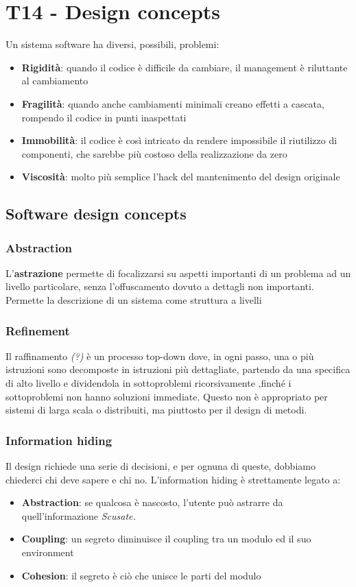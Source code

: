 \documentclass[11pt]{article}
\begin{document}
\section{T14 - Design concepts}
Un sistema software ha diversi, possibili, problemi: 
\begin{itemize}
    \item \textbf{Rigidità}: quando il codice è difficile da cambiare, il management è riluttante al cambiamento 
    \item \textbf{Fragilità}: quando anche cambiamenti minimali creano effetti a cascata, rompendo il codice in punti inaspettati 
    \item \textbf{Immobilità}: il codice è così intricato da rendere impossibile il riutilizzo di componenti, che sarebbe più costoso della realizzazione da zero
    \item \textbf{Viscosità}: molto più semplice l'hack del mantenimento del design originale
\end{itemize}
\subsection{Software design concepts}
\subsubsection{Abstraction}
L'\textbf{astrazione} permette di focalizzarsi su aspetti importanti di un problema ad un livello particolare, senza l'offuscamento dovuto a dettagli non importanti. Permette la descrizione di un sistema come struttura a livelli 
\subsubsection{Refinement} 
Il raffinamento \textit{(?)} è un processo top-down dove, in ogni passo, una o più istruzioni sono decomposte in istruzioni più dettagliate, partendo da una specifica di alto livello e dividendola in sottoproblemi ricorsivamente ,finché i sottoproblemi non hanno soluzioni immediate. Questo non è appropriato per sistemi di larga scala o distribuiti, ma piuttosto per il design di metodi. 
\subsubsection{Information hiding}
Il design richiede una serie di decisioni, e per ognuna di queste, dobbiamo chiederci chi deve sapere e chi no. L'information hiding è strettamente legato a:
\begin{itemize}
    \item \textbf{Abstraction}: se qualcosa è nascosto, l'utente può astrarre da quell'informazione \textit{Scusate.}
    \item \textbf{Coupling}: un segreto diminuisce il coupling tra un modulo ed il suo environment 
    \item \textbf{Cohesion}: il segreto è ciò che unisce le parti del modulo 
\end{itemize}
\end{document}
